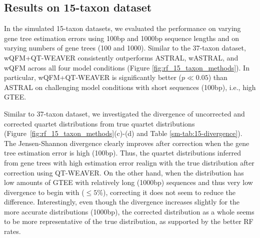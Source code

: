 \documentclass[10pt,a4paper]{article}
\begin{document}

\subsection{Results on 15-taxon dataset}

In the simulated 15-taxon datasets, we evaluated the performance on varying gene tree estimation errors using 100bp and 1000bp sequence lengths and on varying numbers of gene trees (100 and 1000). Similar to the 37-taxon dataset, wQFM+QT-WEAVER consistently outperforms ASTRAL, wASTRAL, and wQFM across all four model conditions (Figure \ref{fig:rf_15_taxon_methods}). In particular, wQFM+QT-WEAVER is significantly better ($p \ll 0.05$) than ASTRAL on challenging model conditions with short sequences (100bp), i.e., high GTEE. %

Similar to 37-taxon dataset, we investigated the divergence of uncorrected and corrected quartet distributions from true quartet distributions (Figure~\ref{fig:rf_15_taxon_methods}(c)-(d) and Table \ref{sm-tab:15-divergence}).
The Jensen-Shannon divergence clearly improves after correction when the gene tree estimation error is high (100bp). Thus, the quartet distributions inferred from gene trees with high estimation error realign with the true distribution after correction using QT-WEAVER. On the other hand, when the distribution has low amounts of GTEE with relatively long (1000bp) sequences and thus very low divergence to begin with ($\le 5$\%), correcting it does not seem to reduce the difference. Interestingly, even though the divergence increases slightly for the more accurate distributions (1000bp), the corrected distribution as a whole seems to be more representative of the true distribution, as supported by the better RF rates.
\end{document}
